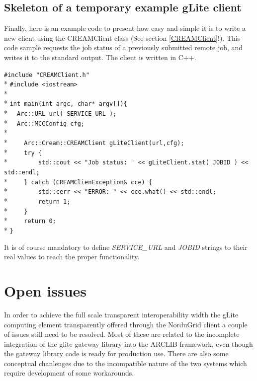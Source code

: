 \documentclass{article}
\begin{document}
\subsection{Skeleton of a temporary example gLite client}
Finally, here is an example code to present how easy and simple it is to write a new client using the CREAMClient class (See section \ref{CREAMClient}!). This code sample requests the job status of a previously submitted remote job, and writes it to the standard output. The client is written in C++.
\begin{framed}
\verb?#include "CREAMClient.h"?\\*
\verb?#include <iostream>?\\*
\\*
\verb?int main(int argc, char* argv[]){?\\*
\verb?  Arc::URL url( SERVICE_URL );?\\*
\verb?  Arc::MCCConfig cfg;?\\*
\\*
\verb?    Arc::Cream::CREAMClient gLiteClient(url,cfg);?\\*
\verb?    try {?\\*
\verb?        std::cout << "Job status: " << gLiteClient.stat( JOBID ) << std::endl;?\\*
\verb?    } catch (CREAMClienException& cce) {?\\*
\verb?        std::cerr << "ERROR: " << cce.what() << std::endl;?\\*
\verb?        return 1;?\\*
\verb?    }?\\*
\verb?    return 0;?\\*
\verb?}?
\end{framed}
It is of course mandatory to define \textit{SERVICE\_URL} and \textit{JOBID} strings to their real values to reach the proper functionality.
\section{Open issues}
In order to achieve the full scale transparent interoperability width the gLite computing element transparently offered through the NorduGrid client a couple of issues still need to be resolved. Most of these are related to the incomplete integration of the glite gateway library into the ARCLIB framework, even though the gateway library code is ready for production use. There are also some conceptual chanlenges due to the incompatible nature of the two systems which require development of some workarounds.
\end{document}
